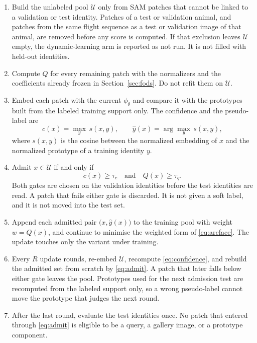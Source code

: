 \begin{enumerate}
    \item Build the unlabeled pool $\mathcal{U}$ only from SAM patches that cannot be linked to a validation or test identity. Patches of a test or validation animal, and patches from the same flight sequence as a test or validation image of that animal, are removed before any score is computed. If that exclusion leaves $\mathcal{U}$ empty, the dynamic-learning arm is reported as not run. It is not filled with held-out identities.
    \item Compute $Q$ for every remaining patch with the normalizers and the coefficients already frozen in Section~\ref{sec:fods}. Do not refit them on $\mathcal{U}$.
    \item Embed each patch with the current $\phi_{\theta}$ and compare it with the prototypes built from the labeled training support only. The confidence and the pseudo-label are
    \begin{equation}
        c(x)=\max_{y}\, s(x,y),
        \qquad
        \hat{y}(x)=\arg\max_{y}\, s(x,y),
        \label{eq:confidence}
    \end{equation}
    where $s(x,y)$ is the cosine between the normalized embedding of $x$ and the normalized prototype of a training identity $y$.
    \item Admit $x\in\mathcal{U}$ if and only if
    \begin{equation}
        c(x)\ge \tau_{c}
        \quad\text{and}\quad
        Q(x)\ge \tau_{q}.
        \label{eq:admit}
    \end{equation}
    Both gates are chosen on the validation identities before the test identities are read. A patch that fails either gate is discarded. It is not given a soft label, and it is not moved into the test set.
    \item Append each admitted pair $\bigl(x,\hat{y}(x)\bigr)$ to the training pool with weight $w=Q(x)$, and continue to minimise the weighted form of \eqref{eq:arcface}. The update touches only the variant under training.
    \item Every $R$ update rounds, re-embed $\mathcal{U}$, recompute \eqref{eq:confidence}, and rebuild the admitted set from scratch by \eqref{eq:admit}. A patch that later falls below either gate leaves the pool. Prototypes used for the next admission test are recomputed from the labeled support only, so a wrong pseudo-label cannot move the prototype that judges the next round.
    \item After the last round, evaluate the test identities once. No patch that entered through \eqref{eq:admit} is eligible to be a query, a gallery image, or a prototype component.
\end{enumerate}

